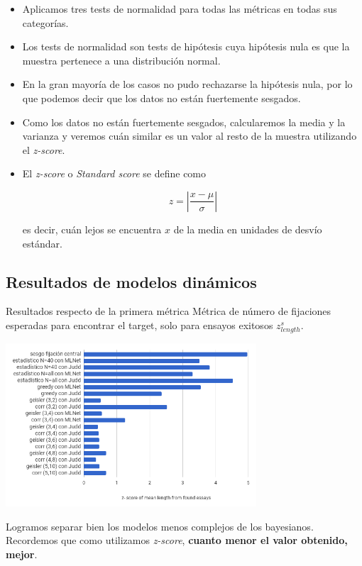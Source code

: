 \documentclass[compress]{beamer}
\begin{document}
\begin{frame}
\begin{itemize}
\item Aplicamos tres tests de normalidad para todas las métricas en todas sus categorías.
\item Los tests de normalidad son tests de hipótesis cuya hipótesis nula es que la muestra pertenece a una distribución normal.
\item En la gran mayoría de los casos no pudo rechazarse la hipótesis nula, por lo que podemos decir que los datos no están fuertemente sesgados.
\end{itemize}
\end{frame}

\begin{frame}
\begin{itemize}
\item Como los datos no están fuertemente sesgados, calcularemos la media y la varianza y veremos cuán similar es un valor al resto de la muestra utilizando el \textit{z-score}.
\item El \textit{z-score} o \textit{Standard score} se define como

$$ z = \left| \dfrac{x-\mu}{\sigma}\right|$$

es decir, cuán lejos se encuentra $x$ de la media en unidades de desvío estándar.
\end{itemize}
\end{frame}

\subsection{Resultados de modelos dinámicos}
\begin{frame}{Resultados respecto de la primera métrica}
{Métrica de número de fijaciones esperadas para
encontrar el target, solo para ensayos exitosos $z_{length}^s$.}

\begin{center}
\includegraphics[width=0.7\textwidth]{images/z-score-mean-length.png}
\end{center}

{\scriptsize Logramos separar bien los modelos menos complejos de los bayesianos. Recordemos que como utilizamos \textit{z-score}, \textbf{cuanto menor el valor obtenido, mejor}.}
\end{frame}
\end{document}
